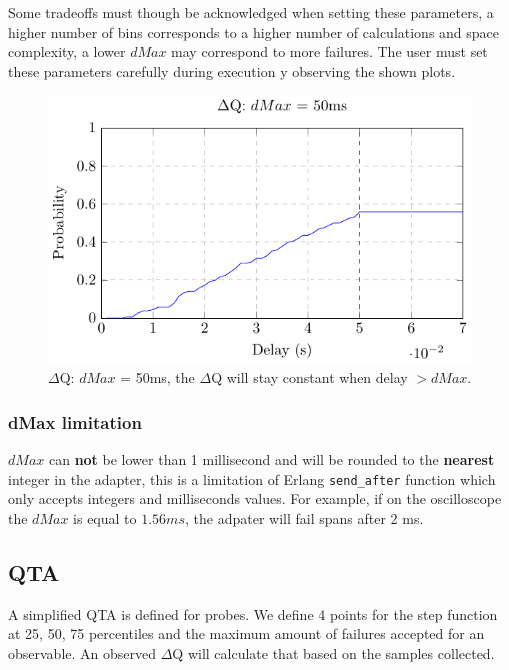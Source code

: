 Some tradeoffs must though be acknowledged when setting these parameters, a higher number of bins corresponds to a higher number of calculations and space complexity, a lower $dMax$ may correspond to more failures. The user must set these parameters carefully during execution y observing the shown plots.

    \begin{figure}[H]
        \begin{center}
            \includegraphics[scale = 1]{tikz/cdf_dmax.pdf}
        \end{center}
        \caption{$\Delta$Q: $dMax$ = 50ms, the $\Delta$Q will stay constant when delay $> dMax$.}
    \end{figure}

    \subsubsection{dMax limitation}
        $dMax$ can \textbf{not} be lower than 1 millisecond and will be rounded to the \textbf{nearest} integer in the adapter, this is a limitation of Erlang \texttt{send\_after} function which only accepts integers and milliseconds values. For example, if on the oscilloscope the $dMax$ is equal to $1.56 ms$, the adpater will fail spans after 2 ms.

    \subsection{QTA}
        A simplified QTA is defined for probes. We define 4 points for the step function at 25, 50, 75 percentiles and the maximum amount of failures accepted for an observable. An observed $\Delta$Q will calculate that based on the samples collected. 

